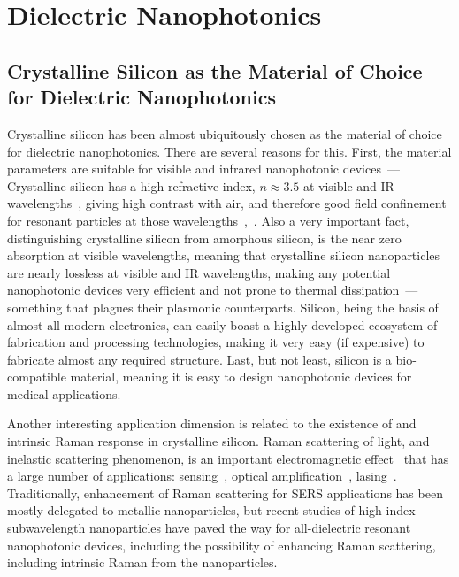 \section{Dielectric Nanophotonics}
\label{ch:DielectricNanophotoics}

    \subsection{Crystalline Silicon as the Material of Choice for Dielectric Nanophotonics}
            Crystalline silicon has been almost ubiquitously chosen as the material of choice for dielectric nanophotonics.
        There are several reasons for this. First, the material parameters are suitable for visible and infrared nanophotonic devices~---
        Crystalline silicon has a high refractive index, $n \approx 3.5$ at visible and IR wavelengths~\cite{li1980refractive}, giving high contrast
        with air, and therefore good field confinement for resonant particles at those wavelengths~\cite{mie1908beitrage},~. Also
        a very important fact, distinguishing crystalline silicon from amorphous silicon, is the near zero absorption at visible wavelengths, meaning
        that crystalline silicon nanoparticles are nearly lossless at visible and IR wavelengths, making any potential nanophotonic devices very
        efficient and not prone to thermal dissipation~--- something that plagues their plasmonic counterparts.
            Silicon, being the basis of almost all modern electronics, can easily boast a highly developed ecosystem of fabrication and processing
        technologies, making it very easy (if expensive) to fabricate almost any required structure.
            Last, but not least, silicon is a bio-compatible material, meaning it is easy to design nanophotonic devices for medical applications.

            Another interesting application dimension is related to the existence of and intrinsic Raman response in crystalline silicon. Raman
        scattering of light, and inelastic scattering phenomenon, is an important electromagnetic effect~\cite{hayes2012scattering} that has a large number of applications:
        sensing~\cite{moskovits1985surface}, optical amplification~\cite{islam2004wideband}, lasing~\cite{pask2003design}.
        Traditionally, enhancement of Raman scattering for SERS applications has been mostly delegated to metallic nanoparticles, but
        recent studies of high-index subwavelength nanoparticles have paved the way for all-dielectric resonant nanophotonic devices, including
        the possibility of enhancing Raman scattering, including intrinsic Raman from the nanoparticles.

